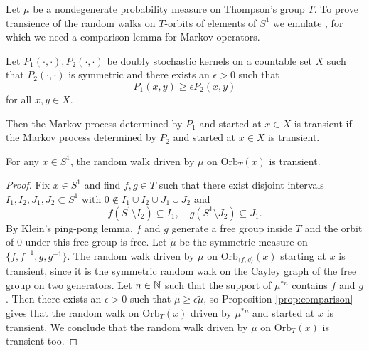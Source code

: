 Let $\mu$ be a nondegenerate probability measure on Thompson's group $T$. To prove transience of the random walks on $T$-orbits of elements of $S^1$ we emulate \cite[Theorem 25]{Kaimanovich2017}, for which we need a comparison lemma for Markov operators.
\begin{proposition}\label{prop:comparison}
    Let $P_1(\cdot, \cdot), P_2(\cdot, \cdot)$ be doubly stochastic kernels on a countable set $X$ such that $P_2(\cdot, \cdot)$ is symmetric and there exists an $\epsilon > 0$ such that
    \[
    P_1(x,y) \geq \epsilon P_2(x,y)
    \]for all $x,y \in X$.

    Then the Markov process determined by $P_1$ and started at $x \in X$ is transient if the Markov process determined by $P_2$ and started at $x \in X$ is transient.
\end{proposition}

\begin{lemma}
    For any $x \in S^1$, the random walk driven by $\mu$ on $\mathrm{Orb}_T(x)$ is transient.
\end{lemma} 
\begin{proof}
    Fix $x \in S^1$ and find $f,g \in T$ such that there exist disjoint intervals $I_1, I_2, J_1, J_2 \subset S^1$ with $0 \not \in I_1 \cup I_2 \cup J_1 \cup J_2$ and 
    \[
    f(S^1 \setminus I_2) \subseteq I_1,\quad g(S^1 \setminus J_2) \subseteq J_1.
    \]
    By Klein's ping-pong lemma, $f$ and $g$ generate a free group inside $T$ and the orbit of 0 under this free group is free. Let $\tilde{\mu}$ be the symmetric measure on $\{f,f^{-1}, g, g^{-1}\}$. The random walk driven by $\tilde{\mu}$ on $\mathrm{Orb}_{\langle f,g\rangle}(x)$ starting at $x$ is transient, since it is the symmetric random walk on the Cayley graph of the free group on two generators. Let $n \in {\mathbb N}$ such that the support of $\mu^{\ast n}$ contains $f$ and $g$. Then there exists an $\epsilon > 0$ such that $\mu \geq \epsilon \tilde{\mu}$, so Proposition \ref{prop:comparison} gives that the random walk on $\mathrm{Orb}_T(x)$ driven by $\mu^{\ast n}$ and started at $x$ is transient. We conclude that the random walk driven by $\mu$ on $\mathrm{Orb}_T(x)$ is transient too.
    \end{proof}



